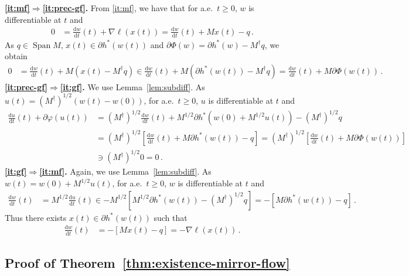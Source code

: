 \documentclass[11pt,english,reqno]{article}
\DeclareMathOperator{\Span}{Span}
\newcommand{\diff}{\mathrm{d}}
\renewcommand{\geq}{\geqslant}
\theoremstyle{plain}
\theoremstyle{definition}
\theoremstyle{remark}
\numberwithin{equation}{section}
\begin{document}
\noindent
\textbf{\ref{it:mf}$ \Rightarrow $\ref{it:prec-gf}.} From \ref{it:mf}, we have that for a.e.~$t \geq 0$, $w$ is differentiable at $t$ and
	\begin{align*}
		0 &= \frac{\diff w}{\diff t}(t) + \nabla \ell(x(t)) = \frac{\diff w}{\diff t}(t) + M x(t) - q \, .
	\end{align*}
	As $q \in \Span M$, $x(t) \in \partial h^*(w(t))$ and $\partial \Phi(w) = \partial h^*(w) - M^\dagger q$, we obtain 
	\begin{align*}
		0 &= \frac{\diff w}{\diff t}(t) + M (x(t) - M^\dagger q) \in \frac{\diff w}{\diff t}(t) + M \left(\partial h^*(w(t)) - M^\dagger q\right) = \frac{\diff w}{\diff t}(t) + M \partial \Phi(w(t)) \, .
	\end{align*}
	\textbf{\ref{it:prec-gf}$ \Rightarrow $\ref{it:gf}.}
	We use Lemma~\ref{lem:subdiff}. As $u(t) = (M^\dagger)^{1/2} (w(t) - w(0))$, for a.e.~$t \geq 0$, $u$ is differentiable at $t$ and
\begin{align*}
	\frac{\diff u}{\diff t}(t) + \partial \varphi(u(t)) &= (M^\dagger)^{1/2} \frac{\diff w}{\diff t}(t) + M^{1/2} \partial h^*(w(0) + M^{1/2} u(t)) - (M^\dagger)^{1/2} q \\
&= (M^\dagger)^{1/2} \left[\frac{\diff w}{\diff t}(t) + M \partial h^*(w(t))-q\right] = (M^\dagger)^{1/2} \left[\frac{\diff w}{\diff t}(t) + M \partial \Phi(w(t))\right] \\
&\ni (M^\dagger)^{1/2} 0 = 0 \, .
\end{align*}
\textbf{\ref{it:gf}$ \Rightarrow $\ref{it:mf}.} Again, we use Lemma~\ref{lem:subdiff}. As $w(t) = w(0) + M^{1/2} u(t)$, for a.e.~$t \geq 0$, $w$ is differentiable at $t$ and
\begin{align*}
	\frac{\diff w}{\diff t}(t) &= M^{1/2} \frac{\diff u}{\diff t}(t) \in - M^{1/2} \left[M^{1/2} \partial h^*(w(t)) - (M^\dagger)^{1/2}q\right] = - \left[M \partial h^*(w(t)) - q\right] \, . 
\end{align*}
Thus there exists $x(t) \in \partial h^*(w(t))$ such that \begin{align*}
	\frac{\diff w}{\diff t}(t) &= - \left[M x(t) - q\right] = - \nabla \ell(x(t)) \, .
\end{align*}


\subsection{\texorpdfstring{Proof of Theorem~\ref{thm:existence-mirror-flow}}{Proof of Theorem (existence of mirror flows)}} 
\label{sec:proof-existence-mirror-flow}
\end{document}

